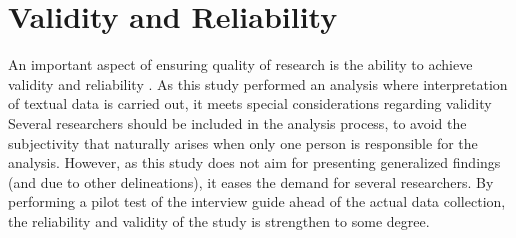   \section{Validity and Reliability}
 An important aspect of ensuring quality of research is the ability to achieve validity and reliability \cite{lazar_research_2017}. As this study performed an analysis where interpretation of textual data is carried out, it meets special considerations regarding validity \cite{lazar_research_2017} %
Several researchers should be included in the analysis process, to avoid the subjectivity that naturally arises when only one person is responsible for the analysis. However, as this study does not aim for presenting generalized findings (and due to other delineations), it eases the demand for several researchers. By performing a pilot test of the interview guide ahead of the actual data collection, the reliability and validity of the study is strengthen to some degree.





